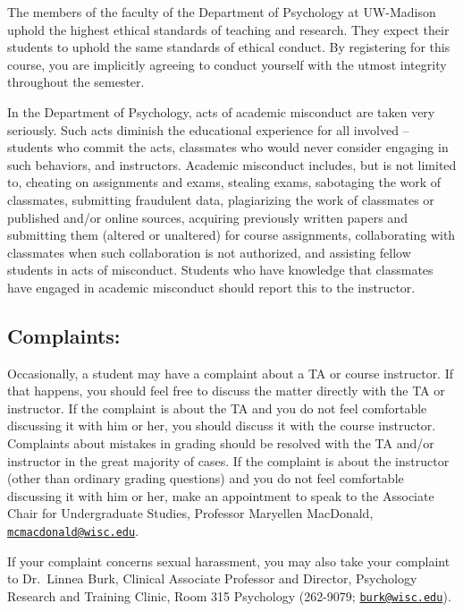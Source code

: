 \documentclass[11pt,man]{article}
\begin{document}
The members of the faculty of the Department of Psychology at UW-Madison
uphold the highest ethical standards of teaching and research. They
expect their students to uphold the same standards of ethical conduct.
By registering for this course, you are implicitly agreeing to conduct
yourself with the utmost integrity throughout the semester.

In the Department of Psychology, acts of academic misconduct are taken
very seriously. Such acts diminish the educational experience for all
involved -- students who commit the acts, classmates who would never
consider engaging in such behaviors, and instructors. Academic
misconduct includes, but is not limited to, cheating on assignments and
exams, stealing exams, sabotaging the work of classmates, submitting
fraudulent data, plagiarizing the work of classmates or published and/or
online sources, acquiring previously written papers and submitting them
(altered or unaltered) for course assignments, collaborating with
classmates when such collaboration is not authorized, and assisting
fellow students in acts of misconduct. Students who have knowledge that
classmates have engaged in academic misconduct should report this to the
instructor.

\subsection{Complaints:}\label{complaints}

Occasionally, a student may have a complaint about a TA or course
instructor. If that happens, you should feel free to discuss the matter
directly with the TA or instructor. If the complaint is about the TA and
you do not feel comfortable discussing it with him or her, you should
discuss it with the course instructor. Complaints about mistakes in
grading should be resolved with the TA and/or instructor in the great
majority of cases. If the complaint is about the instructor (other than
ordinary grading questions) and you do not feel comfortable discussing
it with him or her, make an appointment to speak to the Associate Chair
for Undergraduate Studies, Professor Maryellen MacDonald,
\href{mailto:mcmacdonald@wisc.edu}{\nolinkurl{mcmacdonald@wisc.edu}}.

If your complaint concerns sexual harassment, you may also take your
complaint to Dr.~Linnea Burk, Clinical Associate Professor and Director,
Psychology Research and Training Clinic, Room 315 Psychology (262-9079;
\href{mailto:burk@wisc.edu}{\nolinkurl{burk@wisc.edu}}).
\end{document}
